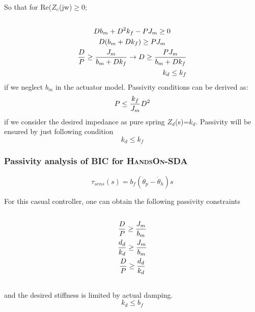 \documentclass[a4paper,12pt]{article}
\begin{document}
So that for Re($Z_e$(jw)$\geq$0;
\begin{equation}
\begin{multlined}\\
Db_m+D^2k_f-PJ_m\geq 0\\
D(b_m+Dk_f)\geq PJ_m\\
\frac{D}{P}\geq \frac{J_m}{b_m+Dk_f}\rightarrow D\geq \frac{PJ_m}{b_m+Dk_f} \\
k_d\leq k_f
\end{multlined}\\
\end{equation}
if we neglect $b_m$ in the actuator model. Passivity conditions can be derived as\cite{calanca}:
\begin{equation}
P\leq \frac{k_f}{J_m}D^2 \\
\end{equation}
if we consider the desired impedance as pure spring $Z_d$(s)=$k_d$. Passivity will be ensured by just following condition
\begin{equation}
k_d\leq k_f
\end{equation}
\subsubsection{Passivity analysis of BIC for \textsc{HandsOn-SDA}}
\begin{equation}
\tau_{sens}(s)=b_f(\dot\theta_p-\dot\theta_h)s
\end{equation}

For this casual controller, one can obtain the following passivity constraints
\begin{equation}
\begin{multlined}\\
\frac{D}{P}\geq \frac{J_m}{b_m}\\
\frac{d_d}{k_d}\geq \frac{J_m}{b_m}\\
\frac{D}{P}\geq\frac{d_d}{k_d} \\
\end{multlined}\\
\end{equation}
and the desired stiffness is limited by actual damping.
\begin{equation}
k_d\leq b_f
\end{equation}
\end{document}
